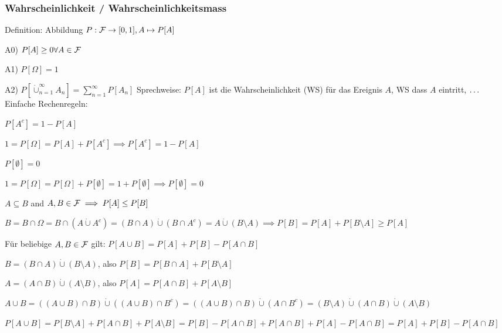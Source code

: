 \subsubsection{Wahrscheinlichkeit / Wahrscheinlichkeitsmass}
Definition: Abbildung $P: \mathcal{F} \rightarrow [0,1], A \mapsto P[A]$
\enumstart
	\item A0) $P[A] \ge 0 \forall A \in \mathcal{F}$
	\item A1) $P[\Omega] = 1$
	\item A2) $P[\dot\cup_{n = 1}^{\infty}A_n] = \sum_{n = 1}^{\infty}P[A_n]$
\enumend
Sprechweise: $P[A]$ ist die Wahrscheinlichkeit (WS) für das Ereignis $A$, WS dass $A$ eintritt, $\mathellipsis$\\
Einfache Rechenregeln:
\enumstart
	\item $P[A^c] = 1 - P[A]$
	\enumstart
		\item $1 = P[\Omega] = P[A] + P[A^c] \implies P[A^c] = 1 - P[A]$
	\enumend
	\item $P[\emptyset] = 0$
	\enumstart
		\item $1 = P[\Omega] = P[\Omega] + P[\emptyset] = 1 + P[\emptyset]\implies P[\emptyset] = 0$
	\enumend
	\item $A \subseteq B$ and $A,B \in \mathcal{F} \implies P[A] \le P[B]$
	\enumstart
		\item $B = B \cap \Omega = B \cap (A \dot\cup A^c) = (B \cap A) \dot\cup (B \cap A^c) = A \dot\cup (B \setminus A) \implies P[B] = P[A] + P[B \setminus A] \ge P[A]$
	\enumend
	\item Für beliebige $A,B \in \mathcal{F}$ gilt: $P[A \cup B] = P[A] + P[B] - P[A \cap B]$
	\enumstart
		\item $B = (B \cap A) \dot\cup (B \setminus A)$, also $P[B] = P[B \cap A] + P[B \setminus A]$
		\item $A = (A \cap B) \dot\cup (A \setminus B)$, also $P[A] = P[A \cap B] + P[A \setminus B]$
		\item $A \cup B = ((A \cup B) \cap B) \dot\cup ((A \cup B) \cap B^c) = ((A \cup B) \cap B) \dot\cup (A \cap B^c) = (B \setminus A) \dot\cup (A \cap B) \dot\cup (A \setminus B)$
		\item $P[A \cup B] = P[B \setminus A] + P[A \cap B] + P[A \setminus B] = P[B] - P[A \cap B] + P[A \cap B] + P[A] - P[A \cap B] = P[A] + P[B] - P[A \cap B]$
	\enumend
\enumend